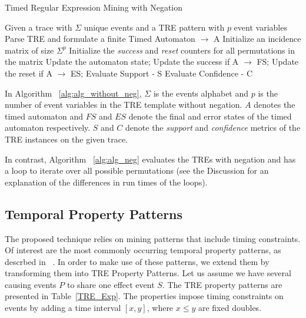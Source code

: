 \documentclass[]{sigplanconf}
\begin{document}
\begin{algorithm}[h]
    \caption{Timed Regular Expression Mining with Negation}
    \begin{algorithmic}[1]
     \Require  Given a trace with $\Sigma$ unique events and a TRE pattern with $p$ event variables
     \Ensure Parse TRE and formulate a finite Timed Automaton $\rightarrow$ A
     \State Initialize an incidence matrix of size $\Sigma^p$
     \State Initialize the \emph{success} and \emph{reset} counters for all permutations in the matrix
        \State Update the automaton state;
        \State Update the success if A $\rightarrow$ FS;
        \State Update the reset if A $\rightarrow$ ES;
   \EndFor
     \EndFor
     \State Evaluate Support - S
     \State Evaluate Confidence - C
    \end{algorithmic}
\label{alg:alg_neg}
\end{algorithm}

In Algorithm ~\ref{alg:alg_without_neg}, $\Sigma$ is the events alphabet and $p$ is the number of event variables in the TRE template without negation. $A$ denotes the timed automaton and $FS$ and $ES$ denote the final and error states of the timed automaton respectively. $S$ and $C$ denote the \emph{support} and \emph{confidence} metrics of the TRE instances on the given trace.

In contrast, Algorithm ~\ref{alg:alg_neg} evaluates the TREs with negation and has a loop to iterate over all possible permutations (see the Discussion for an explanation of the differences in run times of the loops).

\subsection{Temporal Property Patterns}

The proposed technique relies on mining patterns that include timing constraints. Of interest are the most commonly occurring temporal property patterns, as descrbed in ~\cite{evans1}. In order to make use of these patterns, we extend them by transforming them into TRE Property Patterns. Let us assume we have several causing events $P$ to share one effect event $S$. The TRE property patterns are presented in Table~\ref{TRE_Exp}. The properties impose timing constraints on events by adding a time interval $[x, y]$, where $x \le y$ are fixed doubles.
\end{document}
